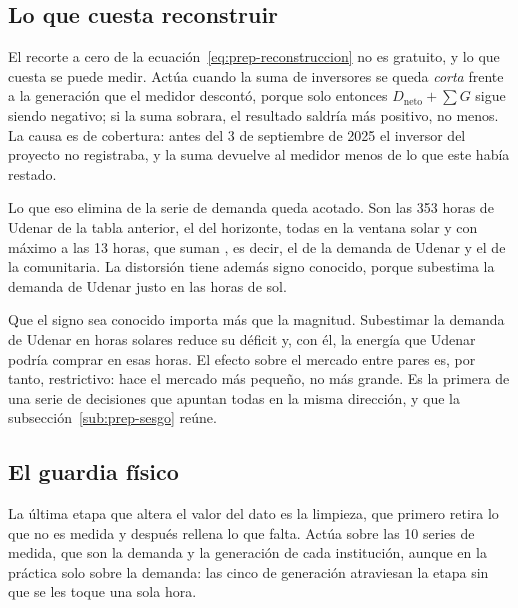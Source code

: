 \begin{guardado}
\subsection{Lo que cuesta reconstruir}
\label{sub:prep-costo}

El recorte a cero de la ecuación~\eqref{eq:prep-reconstruccion} no es
gratuito, y lo que cuesta se puede medir. Actúa cuando la suma de
inversores se queda \emph{corta} frente a la generación que el medidor
descontó, porque solo entonces $D_{\text{neto}} + \sum G$ sigue siendo
negativo; si la suma sobrara, el resultado saldría más positivo, no menos.
La causa es de cobertura: antes del 3 de septiembre de \num{2025} el
inversor del proyecto no registraba, y la suma devuelve al medidor menos
de lo que este había restado.

Lo que eso elimina de la serie de demanda queda acotado. Son las
\num{353} horas de Udenar de la tabla anterior, el  del
horizonte, todas en la ventana solar y con máximo a las 13 horas, que
suman , es decir, el  de la demanda de Udenar y
el  de la comunitaria. La distorsión tiene además signo
conocido, porque subestima la demanda de Udenar justo en las horas de
sol.

\begin{lecturabox}
Que el signo sea conocido importa más que la magnitud. Subestimar la
demanda de Udenar en horas solares reduce su déficit y, con él, la energía
que Udenar podría comprar en esas horas. El efecto sobre el mercado entre
pares es, por tanto, restrictivo: hace el mercado más pequeño, no más
grande. Es la primera de una serie de decisiones que apuntan todas en la
misma dirección, y que la subsección~\ref{sub:prep-sesgo} reúne.
\end{lecturabox}
\end{guardado}

\subsection{El guardia físico}
\label{sub:prep-umbral}

La última etapa que altera el valor del dato es la limpieza, que primero
retira lo que no es medida y después rellena lo que falta. Actúa sobre las
10 series de medida, que son la demanda y la generación de cada
institución, aunque en la práctica solo sobre la demanda: las cinco de
generación atraviesan la etapa sin que se les toque una sola hora.


